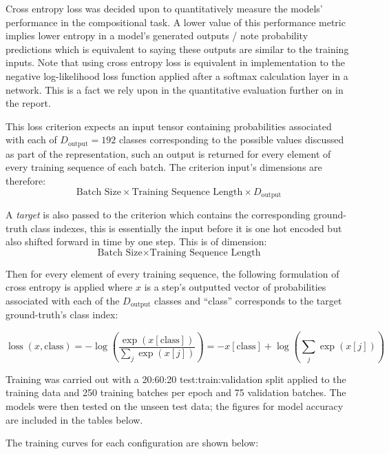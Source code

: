 \documentclass[12pt,]{article}
\begin{document}
Cross entropy loss was decided upon to quantitatively measure the
models' performance in the compositional task. A lower value of this
performance metric implies lower entropy in a model's generated outputs
/ note probability predictions which is equivalent to saying these
outputs are similar to the training inputs. Note that using cross
entropy loss is equivalent in implementation to the negative
log-likelihood loss function applied after a softmax calculation layer
in a network. This is a fact we rely upon in the quantitative evaluation
further on in the report.

This loss criterion expects an input tensor containing probabilities
associated with each of \(D_{\text{output}} = 192\) classes
corresponding to the possible values discussed as part of the
representation, such an output is returned for every element of every
training sequence of each batch. The criterion input's dimensions are
therefore:
\[\text{Batch Size} \times \text{Training Sequence Length} \times D_{\text{output}}\]

A \emph{target} is also passed to the criterion which contains the
corresponding ground-truth class indexes, this is essentially the input
before it is one hot encoded but also shifted forward in time by one
step. This is of dimension:
\[\text{Batch Size} \times \text{Training Sequence Length}\]

Then for every element of every training sequence, the following
formulation of cross entropy is applied where \(x\) is a step's
outputted vector of probabilities associated with each of the
\(D_{\text{output}}\) classes and ``class'' corresponds to the target
ground-truth's class index:

\[
\operatorname{loss}(x, \text {class})=-\log \left(\frac{\exp (x[\text{class}])}{\sum_{j} \exp (x[j])}\right)=-x[\text {class}]+\log \left(\sum_{j} \exp (x[j])\right)
\]

Training was carried out with a 20:60:20 test:train:validation split
applied to the training data and 250 training batches per epoch and 75
validation batches. The models were then tested on the unseen test data;
the figures for model accuracy are included in the tables below.

The training curves for each configuration are shown below:
\end{document}

